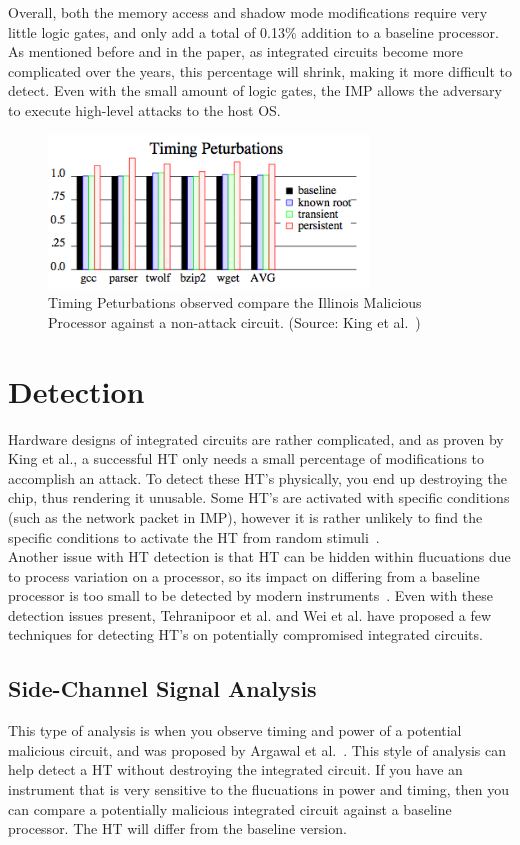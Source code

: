 \documentclass[letterpaper,twocolumn,11pt]{article}
\begin{document}
Overall, both the memory access and shadow mode modifications require very little logic gates, and only add a total of 0.13\% addition to a baseline processor. As mentioned before and in the paper, as integrated circuits become more complicated over the years, this percentage will shrink, making it more difficult to detect. Even with the small amount of logic gates, the IMP allows the adversary to execute high-level attacks to the host OS. 

\begin{figure}[ht!]
\centering
\includegraphics[width=85mm]{images/timing_king.png}
\caption{Timing Peturbations observed compare the Illinois Malicious Processor against a non-attack circuit. (Source: King et al.~\cite {king})}
\label{kingtiming}
\end{figure}

\section{Detection}
Hardware designs of integrated circuits are rather complicated, and as proven by King et al., a successful HT only needs a small percentage of modifications to accomplish an attack. To detect these HT's physically, you end up destroying the chip, thus rendering it unusable. Some HT's are activated with specific conditions (such as the network packet in IMP), however it is rather unlikely to find the specific conditions to activate the HT from random stimuli~\cite {teh}. \\

Another issue with HT detection is that HT can be hidden within flucuations due to process variation on a processor, so its impact on differing from a baseline processor is too small to be detected by modern instruments~\cite {wei}. Even with these detection issues present, Tehranipoor et al. and Wei et al. have proposed a few techniques for detecting HT's on potentially compromised integrated circuits. 

\subsection{Side-Channel Signal Analysis}
This type of analysis is when you observe timing and power of a potential malicious circuit, and was proposed by Argawal et al.~\cite {arg}. This style of analysis can help detect a HT without destroying the integrated circuit. If you have an instrument that is very sensitive to the flucuations in power and timing, then you can compare a potentially malicious integrated circuit against a baseline processor. The HT will differ from the baseline version. \\
\end{document}
